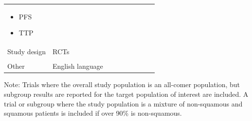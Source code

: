 \documentclass[11pt,final,fleqn]{article}\usepackage[]{graphicx}\usepackage[]{color}
\theoremstyle{plain}
\begin{document}
\begin{appendices}
\begin{table}[!ht]
\begin{center}
\begin{threeparttable}
\begin{tabular}{p{0.3\linewidth}p{0.7\linewidth}}
\begin{itemize}
\item PFS
\item TTP
\end{itemize} \\
Study design & RCTs \\
&\\
Other & English language\\
\hline
\end{tabular}
\scriptsize Note: Trials where the overall study population is an all-comer population, but subgroup results are reported for the target population of interest are included. A trial or subgroup where the study population is a mixture of non-squamous and squamous patients is included if over 90\% is non-squamous. 
\end{threeparttable}
\end{center}
\end{table}



\end{appendices}
\end{document}
